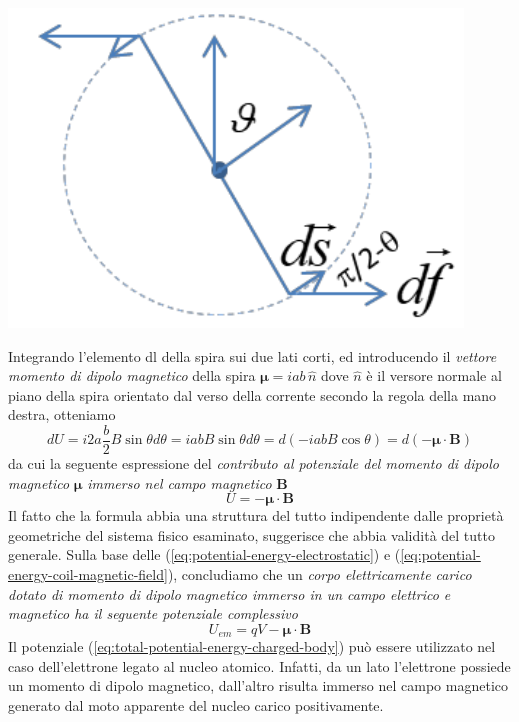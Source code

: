 \begin{marginfigure}
	\includegraphics{figs/rectangular-coil-angle}
	\label{fig:rectangular-coil-angle}
\end{marginfigure}
Integrando l’elemento dl della spira sui due lati corti, ed introducendo il \emph{vettore momento di dipolo magnetico} della spira $\bm{\mu} = i ab \, \hat{n}$ dove $\hat{n}$ è il versore normale al piano della spira orientato dal verso della corrente secondo la regola della mano destra, otteniamo
\[
dU = i 2a \frac{b}{2} B \sin \theta d \theta = i a bB \sin \theta d \theta =
d(-iabB \cos \theta) = d (-\bm{\mu} \cdot \bm{B})
\]
da cui la seguente espressione del \emph{contributo al potenziale del momento di  dipolo magnetico} $\bm{\mu}$ \emph{immerso nel campo magnetico} $\bm{B}$
\begin{equation}
	U = - \bm{\mu} \cdot \bm{B}
	\label{eq:potential-energy-coil-magnetic-field}
\end{equation}
Il fatto che la formula abbia una struttura del tutto indipendente dalle proprietà geometriche del sistema fisico esaminato, suggerisce che abbia validità del tutto generale.
Sulla base delle (\ref{eq:potential-energy-electrostatic}) e (\ref{eq:potential-energy-coil-magnetic-field}), concludiamo che un \emph{corpo elettricamente carico dotato di momento di dipolo magnetico immerso in un campo elettrico e magnetico ha il seguente potenziale complessivo}
\begin{equation}
	U_{em} = qV - \bm{\mu} \cdot \bm{B}
	\label{eq:total-potential-energy-charged-body}
\end{equation}
Il potenziale (\ref{eq:total-potential-energy-charged-body}) può essere utilizzato nel caso dell’elettrone legato al nucleo atomico. Infatti, da un lato l’elettrone possiede un momento di dipolo magnetico, dall’altro risulta immerso nel campo magnetico generato dal moto apparente del nucleo carico positivamente.
\bigskip


